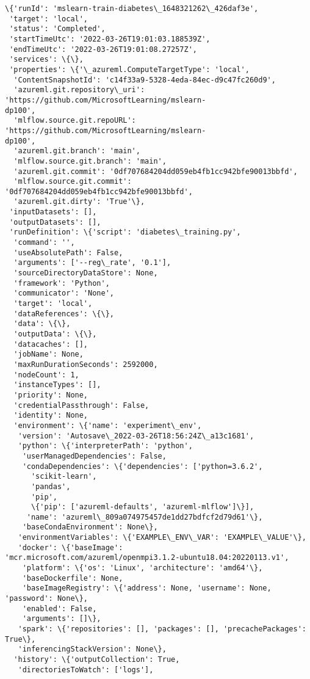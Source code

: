\documentclass[11pt]{article}
\makeatletter
\newcommand{\boxspacing}{\kern\kvtcb@left@rule\kern\kvtcb@boxsep}
\newcommand{\prompt}[4]{
        {\ttfamily\llap{{\color{#2}[#3]:\hspace{3pt}#4}}\vspace{-\baselineskip}}
    }
\makeatother
\begin{document}
    
            \begin{tcolorbox}[breakable, size=fbox, boxrule=.5pt, pad at break*=1mm, opacityfill=0]
\prompt{Out}{outcolor}{9}{\boxspacing}
\begin{Verbatim}[commandchars=\\\{\}]
\{'runId': 'mslearn-train-diabetes\_1648321262\_426daf3e',
 'target': 'local',
 'status': 'Completed',
 'startTimeUtc': '2022-03-26T19:01:03.188539Z',
 'endTimeUtc': '2022-03-26T19:01:08.27257Z',
 'services': \{\},
 'properties': \{'\_azureml.ComputeTargetType': 'local',
  'ContentSnapshotId': 'c14f33a9-5328-4eda-84ec-d9c47fc260d9',
  'azureml.git.repository\_uri': 'https://github.com/MicrosoftLearning/mslearn-
dp100',
  'mlflow.source.git.repoURL': 'https://github.com/MicrosoftLearning/mslearn-
dp100',
  'azureml.git.branch': 'main',
  'mlflow.source.git.branch': 'main',
  'azureml.git.commit': '0df707684204dd059eb4fb1cc942bfe90013bbfd',
  'mlflow.source.git.commit': '0df707684204dd059eb4fb1cc942bfe90013bbfd',
  'azureml.git.dirty': 'True'\},
 'inputDatasets': [],
 'outputDatasets': [],
 'runDefinition': \{'script': 'diabetes\_training.py',
  'command': '',
  'useAbsolutePath': False,
  'arguments': ['--reg\_rate', '0.1'],
  'sourceDirectoryDataStore': None,
  'framework': 'Python',
  'communicator': 'None',
  'target': 'local',
  'dataReferences': \{\},
  'data': \{\},
  'outputData': \{\},
  'datacaches': [],
  'jobName': None,
  'maxRunDurationSeconds': 2592000,
  'nodeCount': 1,
  'instanceTypes': [],
  'priority': None,
  'credentialPassthrough': False,
  'identity': None,
  'environment': \{'name': 'experiment\_env',
   'version': 'Autosave\_2022-03-26T18:56:24Z\_a13c1681',
   'python': \{'interpreterPath': 'python',
    'userManagedDependencies': False,
    'condaDependencies': \{'dependencies': ['python=3.6.2',
      'scikit-learn',
      'pandas',
      'pip',
      \{'pip': ['azureml-defaults', 'azureml-mlflow']\}],
     'name': 'azureml\_809a074975457de1dd27bdfcf2d79d61'\},
    'baseCondaEnvironment': None\},
   'environmentVariables': \{'EXAMPLE\_ENV\_VAR': 'EXAMPLE\_VALUE'\},
   'docker': \{'baseImage':
'mcr.microsoft.com/azureml/openmpi3.1.2-ubuntu18.04:20220113.v1',
    'platform': \{'os': 'Linux', 'architecture': 'amd64'\},
    'baseDockerfile': None,
    'baseImageRegistry': \{'address': None, 'username': None, 'password': None\},
    'enabled': False,
    'arguments': []\},
   'spark': \{'repositories': [], 'packages': [], 'precachePackages': True\},
   'inferencingStackVersion': None\},
  'history': \{'outputCollection': True,
   'directoriesToWatch': ['logs'],

\end{Verbatim}
\end{tcolorbox}
\end{document}

